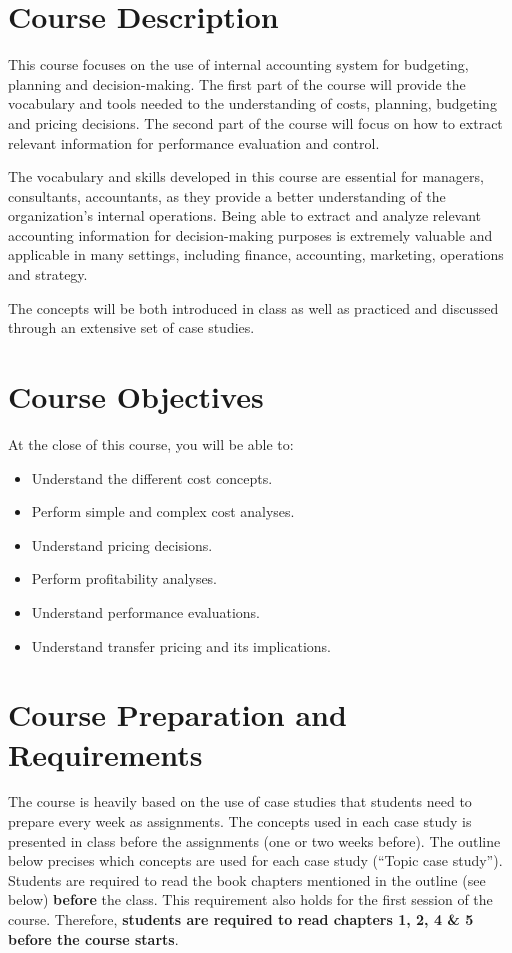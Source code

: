 \documentclass{article}
\begin{document}
\newpage
\section*{Course Description}
This course focuses on the use of internal accounting system for budgeting,
planning and decision-making.
The first part of the course will provide the vocabulary and tools needed to
the understanding of costs, planning, budgeting and pricing decisions.
The second part of the course will focus on how to extract relevant information
for performance evaluation and control.

The vocabulary and skills developed in this course are essential for managers,
consultants, accountants, as they provide a better understanding of the
organization's internal operations. Being able to extract and analyze
relevant accounting information for decision-making purposes is extremely
valuable and applicable in many settings, including finance, accounting,
marketing, operations and strategy.

The concepts will be both introduced in class as well as practiced and
discussed through an extensive set of case studies.

\section*{Course Objectives}

At the close of this course, you will be able to:
\begin{itemize}
	\item Understand the different cost concepts.
	\item Perform simple and complex cost analyses.
	\item Understand pricing decisions.
	\item Perform profitability analyses.
	\item Understand performance evaluations.
	\item Understand transfer pricing and its implications.
\end{itemize}

\section*{Course Preparation and Requirements}
The course is heavily based on the use of case studies that students need to
prepare every week as assignments.
The concepts used in each case study is presented in class before the assignments
(one or two weeks before).
The outline below precises which concepts are used for each case study (``Topic case study'').
Students are required to read the book chapters mentioned in the outline (see below)
{\bf before} the class. This requirement also holds for the first session of the course.
Therefore, {\bf students are required to read chapters 1, 2, 4 \& 5 before the course
starts}.
\end{document}
